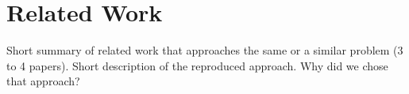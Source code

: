 \section{Related Work}

Short summary of related work that approaches the same or a similar problem (3 to 4 papers).
Short description of the reproduced approach. Why did we chose that approach?
